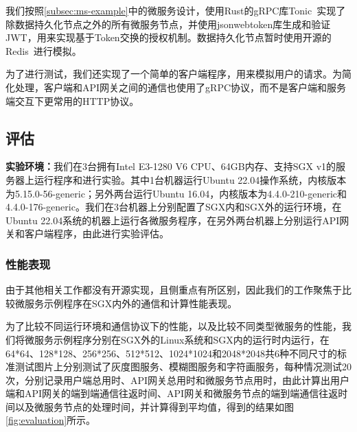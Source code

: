 我们按照\cref{subsec:ms-example}中的微服务设计，使用Rust的gRPC库Tonic~\cite{tonic}实现了除数据持久化节点之外的所有微服务节点，并使用jsonwebtoken库生成和验证JWT，用来实现基于Token交换的授权机制。数据持久化节点暂时使用开源的Redis~\cite{redis}进行模拟。

为了进行测试，我们还实现了一个简单的客户端程序，用来模拟用户的请求。为简化处理，客户端和API网关之间的通信也使用了gRPC协议，而不是客户端和服务端交互下更常用的HTTP协议。

\subsection{评估}

\textbf{实验环境：}我们在3台拥有Intel E3-1280 V6 CPU、64GB内存、支持SGX v1的服务器上运行程序和进行实验。其中1台机器运行Ubuntu 22.04操作系统，内核版本为5.15.0-56-generic；另外两台运行Ubuntu 16.04，内核版本为4.4.0-210-generic和4.4.0-176-generic。我们在3台机器上分别配置了SGX内和SGX外的运行环境，在Ubuntu 22.04系统的机器上运行各微服务程序，在另外两台机器上分别运行API网关和客户端程序，由此进行实验评估。

\subsubsection{性能表现}

由于其他相关工作都没有开源实现，且侧重点有所区别，因此我们的工作聚焦于比较微服务示例程序在SGX内外的通信和计算性能表现。

为了比较不同运行环境和通信协议下的性能，以及比较不同类型微服务的性能，我们将微服务示例程序分别在SGX外的Linux系统和SGX内的运行时内运行，在64*64、128*128、256*256、512*512、1024*1024和2048*2048共6种不同尺寸的标准测试图片上分别测试了灰度图服务、模糊图服务和字符画服务，每种情况测试20次，分别记录用户端总用时、API网关总用时和微服务节点用时，由此计算出用户端和API网关的端到端通信往返时间、API网关和微服务节点的端到端通信往返时间以及微服务节点的处理时间，并计算得到平均值，得到的结果如图\ref{fig:evaluation}所示。

